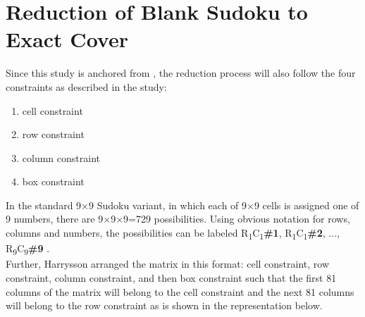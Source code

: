 \documentclass[a4paper,oneside,11pt]{report}
\begin{document}
\section{Reduction of Blank Sudoku to Exact Cover}
Since this study is anchored from \cite{Harrysson}, the reduction process will also follow the four constraints as described in the study: 
\begin{enumerate}[label=\alph*.]
\item cell constraint
\vspace{-0.5cm}
\item row constraint
\vspace{-0.5cm}
\item column constraint
\vspace{-0.5cm}
\item box constraint
\end{enumerate}
 In the standard 9$\times$9 Sudoku variant, in which each of 9$\times$9 cells is assigned one of 9 numbers, there are 9$\times$9$\times$9=729 possibilities. Using obvious notation for rows, columns and numbers, the possibilities can be labeled R\textsubscript{1}C\textsubscript{1}\textbf{\#1}, R\textsubscript{1}C\textsubscript{1}\textbf{\#2}, ..., R\textsubscript{9}C\textsubscript{9}\textbf{\#9} \cite{Harrysson}.\\

\noindent Further, Harrysson arranged the matrix in this format: cell constraint, row constraint, column constraint, and then box constraint such that the first 81 columns of the matrix will belong to the cell constraint and the next 81 columns will belong to the row constraint as is shown in the representation below.\\
\end{document}
